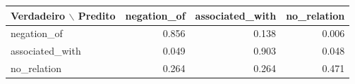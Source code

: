 \begin{tabular}{lrrr}
\toprule
Verdadeiro $\backslash$ Predito & negation\_of & associated\_with & no\_relation \\
\midrule
negation\_of & 0.856 & 0.138 & 0.006 \\
associated\_with & 0.049 & 0.903 & 0.048 \\
no\_relation & 0.264 & 0.264 & 0.471 \\
\bottomrule
\end{tabular}
